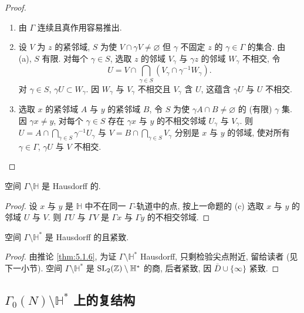 \begin{proof}
\begin{enumerate}[label=\textup{(\alph*)}]
\item 由 $\Gamma$ 连续且真作用容易推出.

\item 设 $V$ 为 $z$ 的紧邻域, $S$ 为使 $V\cap\gamma V\neq\varnothing$ 但 $\gamma$ 不固定 $z$ 的 $\gamma\in\Gamma$ 的集合. 由 (a), $S$ 有限. 对每个 $\gamma\in S$, 选取 $z$ 的邻域 $V_\gamma$ 与 $\gamma z$ 的邻域 $W_\gamma$ 不相交, 令
\[
U = V\cap\bigcap_{\gamma\in S}(V_\gamma\cap\gamma^{-1}W_\gamma).
\]
对 $\gamma\in S$, $\gamma U\subset W_\gamma$. 因 $W_\gamma$ 与 $V_\gamma$ 不相交且 $V_\gamma$ 含 $U$, 这蕴含 $\gamma U$ 与 $U$ 不相交.

\item 选取 $x$ 的紧邻域 $A$ 与 $y$ 的紧邻域 $B$, 令 $S$ 为使 $\gamma A\cap B\neq\varnothing$ 的 (有限) $\gamma$ 集. 因 $\gamma x\neq y$, 对每个 $\gamma\in S$ 存在 $\gamma x$ 与 $y$ 的不相交邻域 $U_\gamma$ 与 $V_\gamma$. 则 $U = A\cap\bigcap_{\gamma\in S}\gamma^{-1}U_\gamma$ 与 $V = B\cap\bigcap_{\gamma\in S}V_\gamma$ 分别是 $x$ 与 $y$ 的邻域, 使对所有 $\gamma\in\Gamma$, $\gamma U$ 与 $V$ 不相交.
\end{enumerate}
\end{proof}

\begin{corollary} \label{thm:5.1.6}
空间 $\Gamma\setminus\mathbb{H}$ 是 Hausdorff 的.
\end{corollary}

\begin{proof}
设 $x$ 与 $y$ 是 $\mathbb{H}$ 中不在同一 $\Gamma$-轨道中的点, 按上一命题的 (c) 选取 $x$ 与 $y$ 的邻域 $U$ 与 $V$. 则 $\Gamma U$ 与 $\Gamma V$ 是 $\Gamma x$ 与 $\Gamma y$ 的不相交邻域.
\end{proof}

\begin{proposition} \label{thm:5.1.7}
空间 $\Gamma\setminus\mathbb{H}^*$ 是 Hausdorff 的且紧致.
\end{proposition}

\begin{proof}
由推论 \ref{thm:5.1.6}, 为证 $\Gamma\setminus\mathbb{H}^*$ Hausdorff, 只剩检验尖点附近, 留给读者 (见下一小节). 空间 $\Gamma\setminus\mathbb{H}^*$ 是 $\operatorname{SL}_2(\mathbb{Z})\setminus\mathbb{H}^*$ 的商, 后者紧致, 因 $\bar{D}\cup\{\infty\}$ 紧致.
\end{proof}

\subsection*{$\Gamma_0(N)\setminus\mathbb{H}^*$ 上的复结构}

